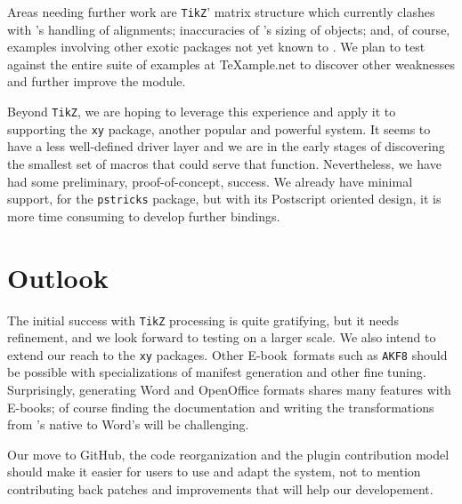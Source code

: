 \documentclass{llncs}
\def\ebook{\mbox{E-book}\xspace}
\def\tikz{\texttt{TikZ}\xspace}
\begin{document}
Areas needing further work are \tikz' matrix
structure which currently clashes with \LaTeXML's handling
of alignments; inaccuracies of \LaTeXML's sizing of objects;
and, of course, examples involving other exotic packages
not yet known to \LaTeXML.  We plan to test against
the entire suite of examples at {\TeX}ample.net to discover
other weaknesses and further improve the module.

Beyond \tikz, we are hoping to leverage this experience and apply
it to supporting the \texttt{xy} package, another
popular and powerful system.  It seems to have a less
well-defined driver layer and we are in the early stages of
discovering the smallest set of macros that could serve that
function. Nevertheless, we have had some preliminary, proof-of-concept, success.
We already have minimal support, for the \texttt{pstricks}
package, but with its Postscript oriented design,
it is more time consuming to develop further bindings.
\section{Outlook}
The initial success with \tikz processing is quite
gratifying, but it needs refinement, and we look forward to testing
on a larger scale. We also intend
to extend our reach to the \texttt{xy} packages.
Other \ebook\ formats such as \texttt{AKF8} should be possible with
specializations of manifest generation and other fine tuning.
Surprisingly, generating Word and OpenOffice formats shares many features
with {\ebook}s; of course finding the documentation and writing the {\XSLT}
transformations from \LaTeXML's native {\XML} to Word's will be challenging.

Our move to GitHub, the code reorganization and the plugin contribution model should make it easier
for users to use and adapt the system, not to mention contributing
back patches and improvements that will help our developement.

\printbibliography
\end{document}

